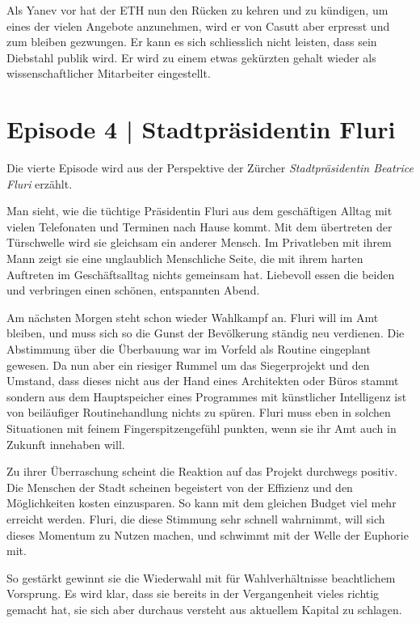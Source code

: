 \documentclass[11pt,a4paper,ngerman]{scrreprt}
\begin{document}
Als Yanev vor hat der ETH nun den Rücken zu kehren und zu kündigen, um eines der
vielen Angebote anzunehmen, wird er von Casutt aber erpresst und zum bleiben
gezwungen. Er kann es sich schliesslich nicht leisten, dass sein Diebstahl
publik wird. Er wird zu einem etwas gekürzten gehalt wieder als
wissenschaftlicher Mitarbeiter eingestellt.

\section*{Episode 4 | Stadtpräsidentin Fluri}

Die vierte Episode wird aus der Perspektive der Zürcher \emph{Stadtpräsidentin
Beatrice Fluri} erzählt.

Man sieht, wie die tüchtige Präsidentin Fluri aus dem geschäftigen Alltag mit
vielen Telefonaten und Terminen nach Hause kommt. Mit dem übertreten der
Türschwelle wird sie gleichsam ein anderer Mensch. Im Privatleben mit ihrem Mann
zeigt sie eine unglaublich Menschliche Seite, die mit ihrem harten Auftreten im
Geschäftsalltag nichts gemeinsam hat. Liebevoll essen die beiden und verbringen
einen schönen, entspannten Abend.

Am nächsten Morgen steht schon wieder Wahlkampf an. Fluri will im Amt
bleiben, und muss sich so die Gunst der Bevölkerung ständig neu verdienen. Die
Abstimmung über die Überbauung war im Vorfeld als Routine eingeplant gewesen. Da
nun aber ein riesiger Rummel um das Siegerprojekt und den Umstand, dass dieses
nicht aus der Hand eines Architekten oder Büros stammt sondern aus dem
Hauptspeicher eines Programmes mit künstlicher Intelligenz ist von beiläufiger
Routinehandlung nichts zu spüren. Fluri muss eben in solchen Situationen mit
feinem Fingerspitzengefühl punkten, wenn sie ihr Amt auch in Zukunft innehaben
will.

Zu ihrer Überraschung scheint die Reaktion auf das Projekt durchwegs
positiv. Die Menschen der Stadt scheinen begeistert von der Effizienz und den
Möglichkeiten kosten einzusparen. So kann mit dem gleichen Budget viel mehr
erreicht werden. Fluri, die diese Stimmung sehr schnell wahrnimmt, will sich
dieses Momentum zu Nutzen machen, und schwimmt mit der Welle der Euphorie mit.

So gestärkt gewinnt sie die Wiederwahl mit für Wahlverhältnisse beachtlichem
Vorsprung. Es wird klar, dass sie bereits in der Vergangenheit vieles richtig
gemacht hat, sie sich aber durchaus versteht aus aktuellem Kapital zu schlagen.
\end{document}

